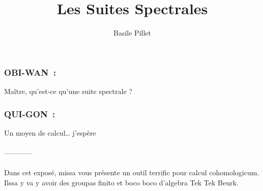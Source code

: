 \documentclass[10pt,a4paper]{article}
\author{Basile Pillet}
\title{Les Suites Spectrales}
\date{}
\begin{document}
\maketitle

\subsubsection*{\textsc{OBI-WAN}~:}
Maître, qu'est-ce qu'une suite spectrale ?
\medskip
\subsubsection*{\textsc{QUI-GON}~:}
Un moyen de calcul… j'espère
\bigskip

\paragraph{}
\hfill------------\hfill
\medskip

\paragraph{} Dans cet exposé, missa vous présente un outil terrific pour calcul cohomologicum. Ilssa y va y avoir des groupas finito et boco boco d'algebra Tek Tek Beurk.


\nocite{Voisin, McCleary}


\end{document}
